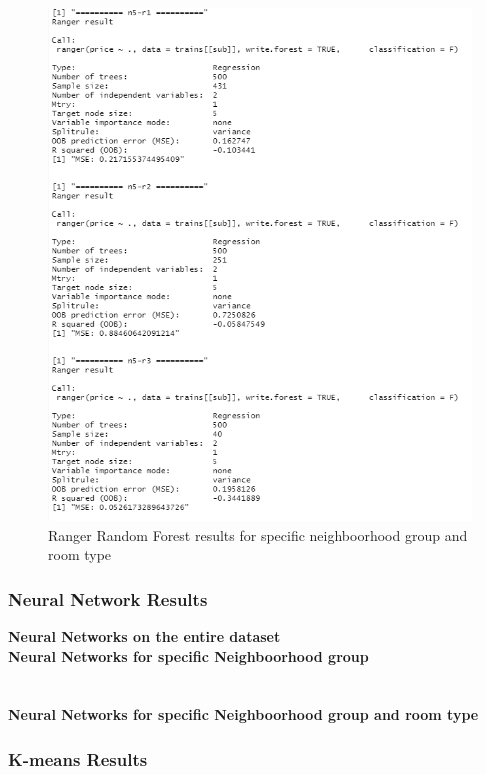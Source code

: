 \documentclass{FR16}
\begin{document}
\begin{figure}[!htb]
\begin{minipage}{0.33\textwidth}
     \includegraphics[width=1\linewidth]{figures/rgn2.5.png}
   \end{minipage}
        \caption{Ranger Random Forest results for specific neighboorhood group and room type}\label{fig:18}

\end{figure}





\newpage
\subsubsection{Neural Network Results}
\textbf{Neural Networks on the entire dataset }\\

\textbf{Neural Networks for specific Neighboorhood group}\\
\\\\ 
\textbf{Neural Networks  for specific Neighboorhood group and room type}




\subsubsection{K-means Results}
\end{document}
